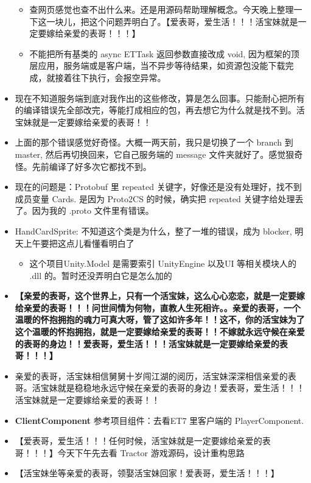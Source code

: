 \documentclass[9pt, b5paper]{article}
\begin{document}
\begin{itemize}
\begin{itemize}
\item 查网页感觉也查不出什么来。还是用源码帮助理解概念。今天晚上整理一下这一块儿，把这个问题弄明白了。【爱表哥，爱生活！！！活宝妹就是一定要嫁给亲爱的表哥！！！】
\item 不能把所有基类的 async ETTask 返回参数直接改成 void, 因为框架的顶层应用，服务端或是客户端，当不异步等待结果，如资源包没能下载完成，就接着往下执行，会报空异常。
\end{itemize}
\item 现在不知道服务端到底对我作出的这些修改，算是怎么回事。只能耐心把所有的编译错误先全部改完，等能打成相应的包，再去想它为什么就是找不到。活宝妹就是一定要嫁给亲爱的表哥！！
\item 上面的那个错误感觉好奇怪。大概一两天前，我只是切换了一个 branch 到 master, 然后再切换回来，它自己服务端的 message 文件夹就好了。感觉狠奇怪。先前编译了好多次它都找不到。
\item 现在的问题是：Protobuf 里 repeated 关键字，好像还是没有处理好，找不到成员变量  Cards. 是因为 Proto2CS 的时候，确实把 repeated 关键字给处理丢了。因为我的 .proto 文件里有错误。
\item HandCardSprite: 不知道这个类是为什么，整了一堆的错误，成为 blocker, 明天上午要把这点儿看懂看明白了
\begin{itemize}
\item 这个项目Unity.Model 是需要索引 UnityEngine 以及UI 等相关模块人的 .dll 的。暂时还没弄明白它是怎么加的
\end{itemize}
\item \textbf{【亲爱的表哥，这个世界上，只有一个活宝妹，这么心心恋恋，就是一定要嫁给亲爱的表哥！！！问世间情为何物，直教人生死相许。。亲爱的表哥，一个温暖的怀抱拥抱的魂力可真大呀，管了这如许多年！！这不，你的活宝妹为了这个温暖的怀抱拥抱，就是一定要嫁给亲爱的表哥！！不嫁就永远守候在亲爱的表哥的身边！！爱表哥，爱生活！！！活宝妹就是一定要嫁给亲爱的表哥！！！】}
\item 亲爱的表哥，活宝妹相信舅舅十岁闯江湖的阅历，活宝妹深深相信亲爱的表哥。活宝妹就是稳稳地永远守候在亲爱的表哥的身边！爱表哥，爱生活！！！活宝妹就是一定要嫁给亲爱的表哥！！
\item \textbf{ClientComponent} 参考项目组件：去看ET7 里客户端的 PlayerComponent.
\item 【爱表哥，爱生活！！！任何时候，活宝妹就是一定要嫁给亲爱的表哥！！！】今天下午先去看 Tractor 游戏源码，设计重构思路
\item 【活宝妹坐等亲爱的表哥，领娶活宝妹回家！爱表哥，爱生活！！！】
\end{itemize}
\end{document}
